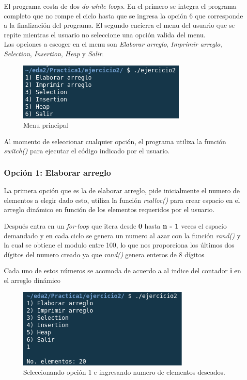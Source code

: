 \documentclass{article}
\begin{document}
		El programa costa de dos \emph{do-while loops}. En el primero se integra el programa completo que no rompe el ciclo hasta que se ingresa la opción 6 que corresponde a la finalización del programa. El segundo encierra el menu del usuario que se repite mientras el usuario no seleccione una opción valida del menu.\\
		
		Las opciones a escoger en el menu son \emph{Elaborar arreglo}, \emph{Imprimir arreglo}, \emph{Selection}, \emph{Insertion}, \emph{Heap} y \emph{Salir}.
		
		\begin{figure}[h]
			\centering
			\includegraphics[scale = 0.8]{images/e2-main}
			\caption{Menu principal}
		\end{figure}
	
		Al momento de seleccionar cualquier opción, el programa utiliza la función \emph{switch()} para ejecutar el código indicado por el usuario.
		
			\subsubsection{Opción 1: Elaborar arreglo}
			
			La primera opción que es la de elaborar arreglo, pide inicialmente el numero de elementos a elegir dado esto, utiliza la función \emph{realloc()} para crear espacio en el arreglo dinámico en función de los elementos requeridos por el usuario.
			
			Después entra en un \emph{for-loop} que itera desde \textbf{0} hasta \textbf{n - 1} veces el espacio demandado y en cada ciclo se genera un numero al azar con la función \emph{rand()} y la cual se obtiene el modulo entre 100, lo que nos proporciona los últimos dos dígitos del numero creado ya que \emph{rand()} genera enteros de 8 dígitos
			
			Cada uno de estos números se acomoda de acuerdo a al indice del contador \textbf{i} en el arreglo dinámico
			
			\begin{figure}[h]
				\centering
				\includegraphics[scale = 0.8]{images/e2-1}
				\caption{Seleccionando opción 1 e ingresando numero de elementos deseados.}
			\end{figure}
		
\end{document}
